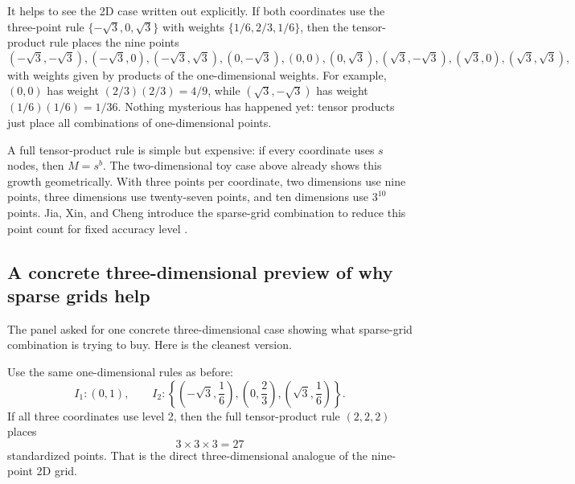 \documentclass[11pt]{article}
\numberwithin{equation}{section}
\begin{document}
It helps to see the 2D case written out explicitly.  If both coordinates use the
three-point rule \(\{-\sqrt3,0,\sqrt3\}\) with weights
\(\{1/6,2/3,1/6\}\), then the tensor-product rule places the nine points
\begin{equation}
  (-\sqrt3,-\sqrt3),
  (-\sqrt3,0),
  (-\sqrt3,\sqrt3),
  (0,-\sqrt3),
  (0,0),
  (0,\sqrt3),
  (\sqrt3,-\sqrt3),
  (\sqrt3,0),
  (\sqrt3,\sqrt3),
  \label{eq:p35-nine-point-grid}
\end{equation}
with weights given by products of the one-dimensional weights.  For example,
\((0,0)\) has weight \((2/3)(2/3)=4/9\), while
\((\sqrt3,-\sqrt3)\) has weight \((1/6)(1/6)=1/36\).  Nothing mysterious has
happened yet: tensor products just place all combinations of one-dimensional
points.

A full tensor-product rule is simple but expensive: if every coordinate uses
\(s\) nodes, then \(M=s^b\).  The two-dimensional toy case above already shows
this growth geometrically.  With three points per coordinate, two dimensions use
nine points, three dimensions use twenty-seven points, and ten dimensions use
\(3^{10}\) points.  Jia, Xin, and Cheng introduce the sparse-grid
combination to reduce this point count for fixed accuracy level
\cite[Section 3]{jia2012sparsegrid}.

\subsection{A concrete three-dimensional preview of why sparse grids help}
\label{subsec:p37-3d-preview}

The panel asked for one concrete three-dimensional case showing what sparse-grid
combination is trying to buy.  Here is the cleanest version.

Use the same one-dimensional rules as before:
\begin{equation}
  I_1:(0,1),
  \qquad
  I_2:\left\{\left(-\sqrt3,\frac16\right),\left(0,\frac23\right),
  \left(\sqrt3,\frac16\right)\right\}.
  \label{eq:p37-level1-level2-rules}
\end{equation}
If all three coordinates use level 2, then the full tensor-product rule
\((2,2,2)\) places
\begin{equation}
  3\times 3\times 3 = 27
  \label{eq:p37-27-points}
\end{equation}
standardized points.  That is the direct three-dimensional analogue of the
nine-point 2D grid.
\end{document}
